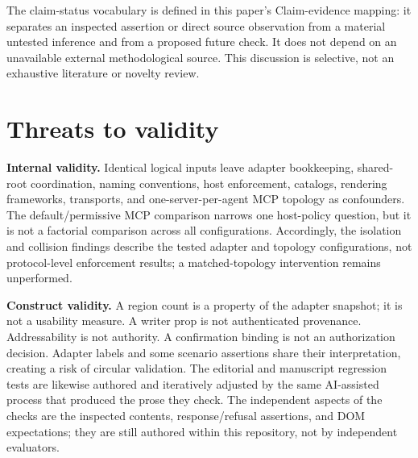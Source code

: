 \documentclass[11pt]{article}
\begin{document}
The claim-status vocabulary is defined in this paper's Claim-evidence
mapping: it separates an inspected assertion or direct source
observation from a material untested inference and from a proposed
future check. It does not depend on an unavailable external
methodological source. This discussion is selective, not an exhaustive
literature or novelty review.

\section{Threats to validity}\label{threats-to-validity}

\textbf{Internal validity.} Identical logical inputs leave adapter
bookkeeping, shared-root coordination, naming conventions, host
enforcement, catalogs, rendering frameworks, transports, and
one-server-per-agent MCP topology as confounders. The default/permissive
MCP comparison narrows one host-policy question, but it is not a
factorial comparison across all configurations. Accordingly, the
isolation and collision findings describe the tested adapter and
topology configurations, not protocol-level enforcement results; a
matched-topology intervention remains unperformed.

\textbf{Construct validity.} A region count is a property of the adapter
snapshot; it is not a usability measure. A writer prop is not
authenticated provenance. Addressability is not authority. A
confirmation binding is not an authorization decision. Adapter labels
and some scenario assertions share their interpretation, creating a risk
of circular validation. The editorial and manuscript regression tests
are likewise authored and iteratively adjusted by the same AI-assisted
process that produced the prose they check. The independent aspects of
the checks are the inspected contents, response/refusal assertions, and
DOM expectations; they are still authored within this repository, not by
independent evaluators.
\end{document}
